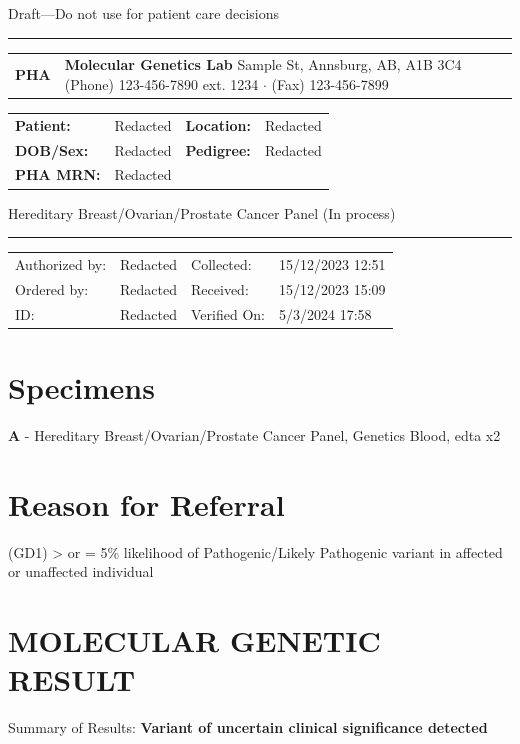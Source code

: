 \documentclass[9pt]{extarticle}
\begin{document}
\begin{center}{\large Draft---Do not use for patient care decisions}\hrule\end{center}


\begin{tabular}{p{2cm} >{\centering\arraybackslash}p{11.59cm} p{2cm}}
{\Huge \bf PHA} & {\bf Molecular Genetics Lab} \newline
123 Sample St, Annsburg, AB, A1B 3C4 \newline
(Phone) 123-456-7890 ext. 1234 $\cdot$ (Fax) 123-456-7899 
& \\
\end{tabular}

\begin{tabular}{p{2cm} p{5.75cm} p{2cm} p{5.75cm}}
{\bf Patient:} & Redacted & {\bf Location:} & Redacted \\
{\bf DOB/Sex:} & Redacted & {\bf Pedigree:} & Redacted\\
{\bf PHA MRN:} & Redacted & & \\
\end{tabular}

Hereditary Breast/Ovarian/Prostate Cancer Panel (In process) 
\hrule
\begin{tabular}{p{2cm} p{5.75cm} p{2cm} p{5.75cm}}
Authorized by: & Redacted & Collected: & 15/12/2023 12:51 \\
Ordered by: & Redacted & Received: & 15/12/2023 15:09 \\
ID: & Redacted & Verified On: & 5/3/2024 17:58 \\
\end{tabular}

\section*{Specimens}
{\bf A} -  Hereditary Breast/Ovarian/Prostate Cancer Panel, Genetics Blood, edta x2

\section*{Reason for Referral}
(GD1) > or = 5\% likelihood of Pathogenic/Likely Pathogenic variant in affected or unaffected individual

\section*{MOLECULAR GENETIC RESULT}
Summary of Results: {\bf Variant of uncertain clinical significance detected}
\end{document}
